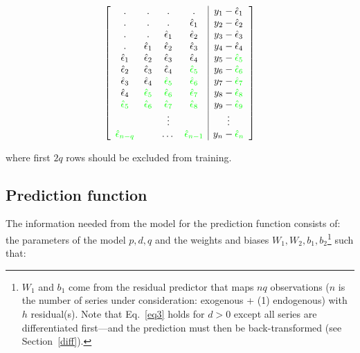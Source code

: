 \documentclass{article}
\begin{document}
$$\left[\begin{array}{cccc|c}
. & . & . & . & y_1-\hat{\epsilon}_1 \\
. & . & . & \hat{\epsilon}_1 & y_2-\hat{\epsilon}_2 \\
. & . & \hat{\epsilon}_1 & \hat{\epsilon}_2 & y_3-\hat{\epsilon}_3 \\
 . & \hat{\epsilon}_1 & \hat{\epsilon}_2 & \hat{\epsilon}_3  & y_4-\hat{\epsilon}_4 \\
\hat{\epsilon}_1 & \hat{\epsilon}_2 & \hat{\epsilon}_3 & \hat{\epsilon}_4  & y_5-\textcolor{green}{\hat{\epsilon}_5} \\
\hat{\epsilon}_2 & \hat{\epsilon}_3 & \hat{\epsilon}_4 & \textcolor{green}{\hat{\epsilon}_5} & y_6-\textcolor{green}{\hat{\epsilon}_6} \\
\hat{\epsilon}_3 & \hat{\epsilon}_4 & \textcolor{green}{\hat{\epsilon}_5} & \textcolor{green}{\hat{\epsilon}_6}  & y_7-\textcolor{green}{\hat{\epsilon}_7} \\
\hat{\epsilon}_4 & \textcolor{green}{\hat{\epsilon}_5} & \textcolor{green}{\hat{\epsilon}_6} & \textcolor{green}{\hat{\epsilon}_7} & y_8-\textcolor{green}{\hat{\epsilon}_8} \\
\textcolor{green}{\hat{\epsilon}_5} & \textcolor{green}{\hat{\epsilon}_6} & \textcolor{green}{\hat{\epsilon}_7} & \textcolor{green}{\hat{\epsilon}_8} & y_9-\textcolor{green}{\hat{\epsilon}_9} \\
  &  & \vdots &  & \vdots \\
\textcolor{green}{\hat{\epsilon}_{n-q}} & & \dots & \textcolor{green}{\hat{\epsilon}_{n-1}} & y_n-\textcolor{green}{\hat{\epsilon}_n}
\end{array}\right]$$

where first $2q$ rows should be excluded from training.


\subsection{Prediction function}
The information needed from the model for the prediction function consists of: the parameters of the model $p, d, q$ and the weights and biases $W_{1}, W_{2}, b_{1}, b_{2}$\footnote{$W_{1}$ and $b_{1}$ come from the residual predictor that maps $nq$ observations ($n$ is the number of series under consideration: exogenous + (1) endogenous) with $h$ residual(s). Note that Eq.~\ref{eq3} holds for $d>0$ except all series are differentiated first---and the prediction must then be back-transformed (see Section~\ref{diff}).} such that:
\end{document}
